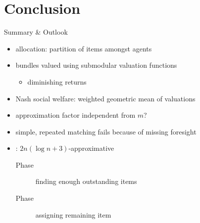 \section{Conclusion}

\begin{frame}{Summary \& Outlook}
	\begin{itemize}
		\item
		allocation:
		partition of items amongst agents

		\item
		bundles valued using submodular valuation functions
		\begin{itemize}
			\item
			diminishing returns
		\end{itemize}

		\item
		Nash social welfare:
		weighted geometric mean of valuations

		\item
		approximation factor independent from \(m\)?

		\item
		simple, repeated matching fails because of missing foresight

		\item
		\RepReMatch:
		\(2n (\log n + 3)\)-approximative
		\begin{description}
			\item[Phase \phasei]
			finding enough outstanding items

			\item[Phase \phaseii]
			assigning remaining item


\end{description}
\end{itemize}
\end{frame}
